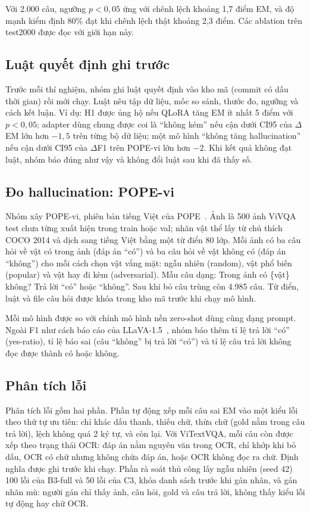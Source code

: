Với 2.000 câu, ngưỡng $p < 0{,}05$ ứng với chênh lệch khoảng 1,7 điểm EM, và độ
mạnh kiểm định 80\% đạt khi chênh lệch thật khoảng 2,3 điểm. Các ablation trên
test2000 được đọc với giới hạn này.

\subsection{Luật quyết định ghi trước}

Trước mỗi thí nghiệm, nhóm ghi luật quyết định vào kho mã (commit có dấu thời
gian) rồi mới chạy. Luật nêu tập dữ liệu, mốc so sánh, thước đo, ngưỡng và cách
kết luận. Ví dụ: H1 được ủng hộ nếu QLoRA tăng EM ít nhất 5 điểm với $p < 0{,}05$;
adapter dùng chung được coi là ``không kém'' nếu cận dưới CI95 của $\Delta$EM lớn
hơn $-1{,}5$ trên từng bộ dữ liệu; một mô hình ``không tăng hallucination'' nếu cận
dưới CI95 của $\Delta$F1 trên POPE-vi lớn hơn $-2$. Khi kết quả không đạt luật,
nhóm báo đúng như vậy và không đổi luật sau khi đã thấy số.

\subsection{Đo hallucination: POPE-vi}
\label{sec:met-pope}

Nhóm xây POPE-vi, phiên bản tiếng Việt của POPE~\cite{li2023pope}. Ảnh là 500 ảnh
ViVQA test chưa từng xuất hiện trong train hoặc val; nhãn vật thể lấy từ chú
thích COCO 2014 và dịch sang tiếng Việt bằng một từ điển 80 lớp. Mỗi ảnh có ba
câu hỏi về vật có trong ảnh (đáp án ``có'') và ba câu hỏi về vật không có (đáp án
``không'') cho mỗi cách chọn vật vắng mặt: ngẫu nhiên (random), vật phổ biến
(popular) và vật hay đi kèm (adversarial). Mẫu câu dạng: Trong ảnh có \{vật\}
không? Trả lời ``có'' hoặc ``không''. Sau khi bỏ câu trùng còn 4.985 câu. Từ điển,
luật và file câu hỏi được khóa trong kho mã trước khi chạy mô hình.

Mỗi mô hình được so với chính mô hình nền zero-shot dùng cùng dạng prompt. Ngoài
F1 như cách báo cáo của LLaVA-1.5~\cite{liu2024llava15}, nhóm báo thêm tỉ lệ trả
lời ``có'' (yes-ratio), tỉ lệ báo sai (câu ``không'' bị trả lời ``có'') và tỉ lệ
câu trả lời không đọc được thành có hoặc không.

\subsection{Phân tích lỗi}
\label{sec:met-error}

Phân tích lỗi gồm hai phần. Phần tự động xếp mỗi câu sai EM vào một kiểu lỗi theo
thứ tự ưu tiên: chỉ khác dấu thanh, thiếu chữ, thừa chữ (gold nằm trong câu trả
lời), lệch không quá 2 ký tự, và còn lại. Với ViTextVQA, mỗi câu còn được xếp
theo trạng thái OCR: đáp án nằm nguyên văn trong OCR, chỉ khớp khi bỏ dấu, OCR có
chữ nhưng không chứa đáp án, hoặc OCR không đọc ra chữ. Định nghĩa được ghi trước
khi chạy. Phần rà soát thủ công lấy ngẫu nhiên (seed 42) 100 lỗi của B3-full và 50 lỗi
của C3, khóa danh sách trước khi gán nhãn, và gán nhãn mù: người gán chỉ thấy ảnh,
câu hỏi, gold và câu trả lời, không thấy kiểu lỗi tự động hay chữ OCR.

